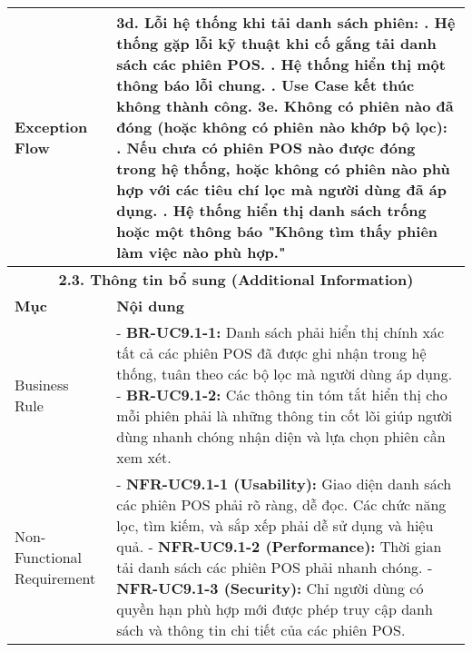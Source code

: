 \begin{longtable}{|m{4cm}|p{11cm}|}
Exception Flow & \textbf{3d. Lỗi hệ thống khi tải danh sách phiên:} \newline    1. Hệ thống gặp lỗi kỹ thuật khi cố gắng tải danh sách các phiên POS. \newline    2. Hệ thống hiển thị một thông báo lỗi chung. \newline    3. Use Case kết thúc không thành công. \newline \textbf{3e. Không có phiên nào đã đóng (hoặc không có phiên nào khớp bộ lọc):} \newline    1. Nếu chưa có phiên POS nào được đóng trong hệ thống, hoặc không có phiên nào phù hợp với các tiêu chí lọc mà người dùng đã áp dụng. \newline    2. Hệ thống hiển thị danh sách trống hoặc một thông báo "Không tìm thấy phiên làm việc nào phù hợp." \\
\hline
\multicolumn{2}{|c|}{\textbf{2.3. Thông tin bổ sung (Additional Information)}} \\
\hline
\textbf{Mục} & \textbf{Nội dung} \\
\hline
Business Rule & - \textbf{BR-UC9.1-1:} Danh sách phải hiển thị chính xác tất cả các phiên POS đã được ghi nhận trong hệ thống, tuân theo các bộ lọc mà người dùng áp dụng. \newline - \textbf{BR-UC9.1-2:} Các thông tin tóm tắt hiển thị cho mỗi phiên phải là những thông tin cốt lõi giúp người dùng nhanh chóng nhận diện và lựa chọn phiên cần xem xét. \\
\hline
Non-Functional Requirement & - \textbf{NFR-UC9.1-1 (Usability):} Giao diện danh sách các phiên POS phải rõ ràng, dễ đọc. Các chức năng lọc, tìm kiếm, và sắp xếp phải dễ sử dụng và hiệu quả. \newline - \textbf{NFR-UC9.1-2 (Performance):} Thời gian tải danh sách các phiên POS phải nhanh chóng. \newline - \textbf{NFR-UC9.1-3 (Security):} Chỉ người dùng có quyền hạn phù hợp mới được phép truy cập danh sách và thông tin chi tiết của các phiên POS. \\
\hline
\end{longtable}

